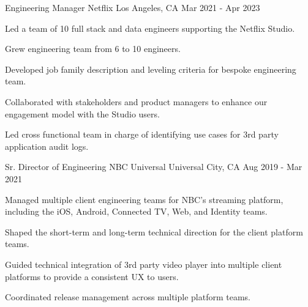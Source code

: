 

\begin{cventries}

  \cventry
    {Engineering Manager} %
    {Netflix} %
    {Los Angeles, CA} %
    {Mar 2021 - Apr 2023} %
    {
      \begin{cvitems} %
        \item {Led a team of 10 full stack and data engineers supporting the Netflix Studio.}
        \item {Grew engineering team from 6 to 10 engineers.}
        \item {Developed job family description and leveling criteria for bespoke engineering team.}
        \item {Collaborated with stakeholders and product managers to enhance our engagement model with the Studio users.}
        \item {Led cross functional team in charge of identifying use cases for 3rd party application audit logs.}
      \end{cvitems}
    }
  
  \cventry
    {Sr. Director of Engineering} %
    {NBC Universal} %
    {Universal City, CA} %
    {Aug 2019 - Mar 2021} %
    {
      \begin{cvitems} %
        \item {Managed multiple client engineering teams for NBC's streaming platform, including the iOS, Android, Connected TV, Web, and Identity teams.}
        \item {Shaped the short-term and long-term technical direction for the client platform teams.}
        \item {Guided technical integration of 3rd party video player into multiple client platforms to provide a consistent UX to users.}
        \item {Coordinated release management across multiple platform teams.}
      \end{cvitems}
    }
    

\end{cventries}
